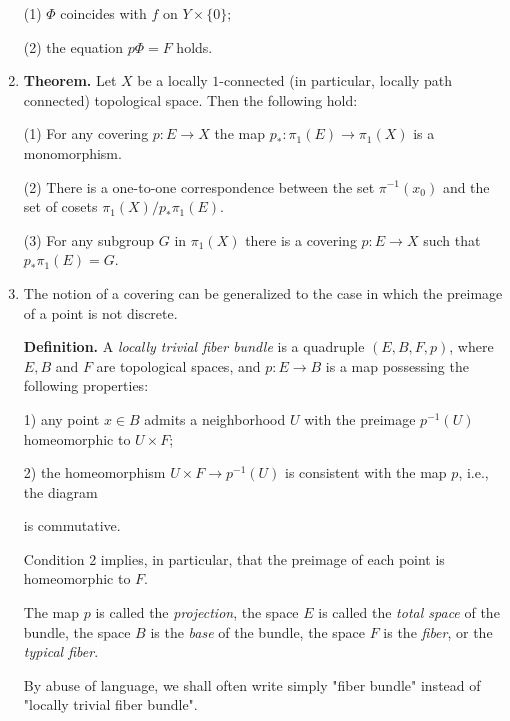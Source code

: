 \documentclass{article}
\begin{document}
\begin{enumerate}
(1) $\Phi$ coincides with $f$ on $Y \times \{0\}$;

(2) the equation $p\Phi = F$ holds.


\item \textbf{Theorem.} Let $X$ be a locally $1$-connected (in
  particular, locally path connected) topological space. Then the
  following hold:

(1) For any covering $p : E \to X$ the map $p_* : \pi_1(E) \to
\pi_1(X)$ is a monomorphism.

(2) There is a one-to-one correspondence between the set
$\pi^{-1}(x_0)$ and the set of cosets $\pi_1(X)/p_*\pi_1(E)$.

(3) For any subgroup $G$ in $\pi_1(X)$ there is a covering $p : E \to
X$ such that $p_*\pi_1(E) = G$.

\item The notion of a covering can be generalized to the case in which
  the preimage of a point is not discrete.

\textbf{Definition.} A \textit{locally trivial fiber bundle} is a
quadruple $(E,B,F,p)$, where $E,B$ and $F$ are topological spaces, and
$p : E \to B$ is a map possessing the following properties:

1) any point $x \in B$ admits a neighborhood $U$ with the preimage
$p^{-1}(U)$ homeomorphic to $U \times F$;

2) the homeomorphism $U \times F \to p^{-1}(U)$ is consistent with the
map $p$, i.e., the diagram


is commutative.

Condition 2 implies, in particular, that the preimage of each point is
homeomorphic to $F$.

The map $p$ is called the \textit{projection}, the space $E$ is called
the \textit{total space} of the bundle, the space $B$ is the \textit{base} of
the bundle, the space $F$ is the \textit{fiber}, or the
\textit{typical fiber}.

By abuse of language, we shall often write simply "fiber bundle"
instead of "locally trivial fiber bundle".


\end{enumerate}
\end{document}
